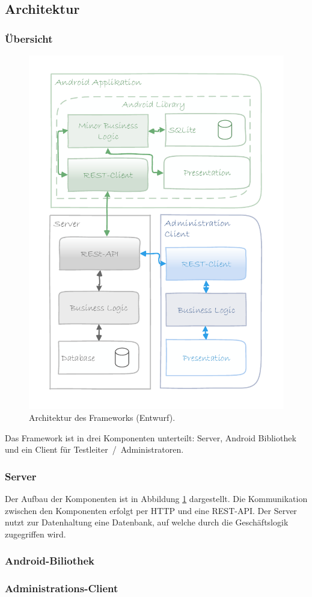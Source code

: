 \subsection{Architektur\label{subsec:architektur}}

\subsubsection{Übersicht}
\begin{figure}
	\centering
	\includegraphics[width=\linewidth]{img/architecture_draft}
	\caption{Architektur des Frameworks (Entwurf).}
	\label{fig:architektur_entwurf}
\end{figure}
Das Framework ist in drei Komponenten unterteilt: Server, Android Bibliothek und ein Client für Testleiter~/~Administratoren.

\subsubsection{Server}
Der Aufbau der Komponenten ist in Abbildung \ref{fig:architektur_entwurf} dargestellt.
Die Kommunikation zwischen den Komponenten erfolgt per \ac{HTTP} und eine \ac{REST}-\ac{API}.
Der Server nutzt zur Datenhaltung eine Datenbank, auf welche durch die Geschäftslogik zugegriffen wird.

\subsubsection{Android-Biliothek}

\subsubsection{Administrations-Client}